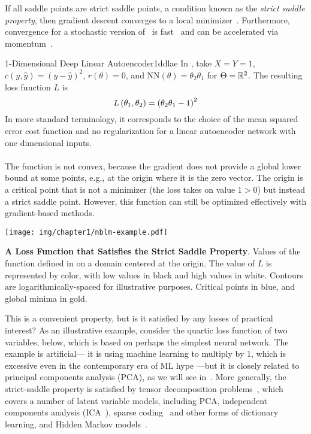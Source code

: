 \documentclass[../../thesis.tex]{subfiles}
\begin{document}
If all saddle points are strict saddle points,
a condition known as the \emph{strict saddle property},
then gradient descent converges to a local minimizer~\cite{lee2016,lee2019}.
Furthermore, convergence for a stochastic
version of~ is fast~\cite{jin2018a}
and can be accelerated via momentum~\cite{jin2018b}.

\begin{example}[float=hp]{1-Dimensional Deep Linear Autoencoder}{1ddlae}
	In , take $X = Y = 1$,
	$c(y, \hat{y}) = {\left(y - \hat{y}\right)}^2$,
	$r(\theta) = 0$,
	and
	$\mathrm{NN}(\theta) = \theta_2\theta_1$
	for $\Theta = \mathbb{R}^2$.
	The resulting loss function $L$ is
	\begin{equation}\equationlabel{nblm-example}
		L\left(\theta_1, \theta_2\right) = {\left(\theta_2\theta_1 - 1\right)}^2
	\end{equation}
	In more standard terminology,
	it corresponds to the choice of
	the mean squared error cost function
	and no regularization
	for a linear autoencoder network
	with one dimensional inputs.
	\\ \ \\
	The function is not convex,
	because the gradient
	does not provide a global lower bound
	at some points, e.g., at the origin
	where it is the zero vector.
	The origin is a critical point
	that is not a minimizer
	(the loss takes on value $1 > 0$)
	but instead a strict saddle point.
	However, this function can still be optimized effectively with
	gradient-based methods.

	\begin{center}
		\texttt{[image: img/chapter1/nblm-example.pdf]}
	\end{center}
	{\textbf{A Loss Function that Satisfies the Strict Saddle Property}.}%
	{Values of the function defined in 
	 on a domain centered at the origin.
	 The value of $L$ is represented by color,
	 with low values in black and high values in white.
	 Contours are logarithmically-spaced for illustrative purposes.
	 Critical points in blue, and global minima in gold.}
\end{example}

This is a convenient property, but is it satisfied
by any losses of practical interest?
As an illustrative example, consider the quartic loss function
of two variables,  below,
which is based on perhaps the simplest neural network.
The example is artificial---
it is using machine learning to multiply by 1,
which is excessive even in the contemporary era of ML hype
---but it is closely related to principal components analysis (PCA),
as we will see in~.
More generally, the strict-saddle property is
satisfied by tensor decomposition problems~\cite{ge2015},
which covers a number of latent variable models, including
PCA,
independent components analysis (ICA~\cite{bell1997,comon2009}),
sparse coding~\cite{olshausen1996}
and other forms of dictionary learning,
and Hidden Markov models~\cite{anandkumar2012}.
\end{document}
